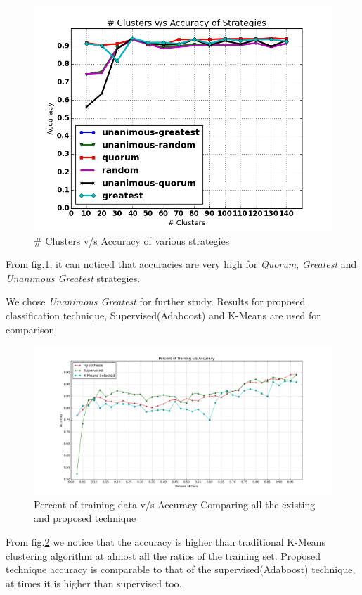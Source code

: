 \documentclass[conference]{IEEEtran}
\begin{document}
\begin{figure}[!t]
	\centering
	\includegraphics[width=1\columnwidth]{hypothesis_updated}
	\caption{\# Clusters v/s Accuracy of various strategies }
	\label{fig:hypo_updated}
\end{figure}
From fig.\ref{fig:hypo_updated}, it can noticed that accuracies are very high for \emph{Quorum}, \emph{Greatest} and \emph{Unanimous Greatest} strategies.

We chose \emph{Unanimous Greatest} for further study. Results for proposed classification technique, Supervised(Adaboost) and K-Means are used for comparison.
\begin{figure}[!t]
	\centering
	\includegraphics[width=1\columnwidth]{super_hypo_accuracy_percent_training}
	\caption{Percent of training data v/s Accuracy Comparing all the existing and proposed technique}
	\label{fig:super_hypo}
\end{figure}
From fig.\ref{fig:super_hypo} we notice that the accuracy is higher than traditional K-Means clustering algorithm at almost all the ratios of the training set. Proposed technique accuracy is comparable to that of the supervised(Adaboost) technique, at times it is higher than supervised too.
\end{document}
